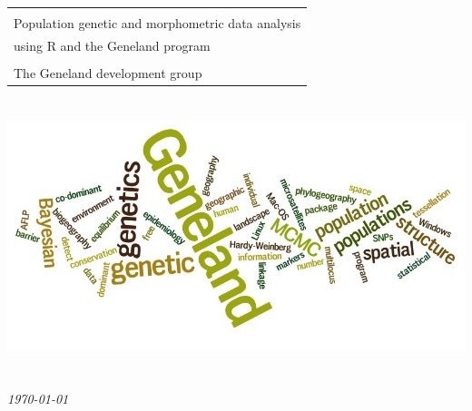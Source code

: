 \documentclass[a4paper,10pt]{article}
\begin{document}


\thispagestyle{empty}
\setlength{\arrayrulewidth}{3pt}
\phantom{m}

\vspace{3cm}\begin{center}
\begin{tabular}{l}
\hline
\\
{\Huge \sf Population genetic and morphometric data analysis }\\
{\Huge \sf using R and the {\sc Geneland} program }\\
\\
{\huge \sf The Geneland development group}
\\
\hline
\end{tabular}
\end{center}

\vspace{3cm}


\includegraphics[height=8cm]{./fig/wdl1.jpeg}

\vspace{4cm}


\hspace{8cm} {\huge \em \today{}} \\
\end{document}
